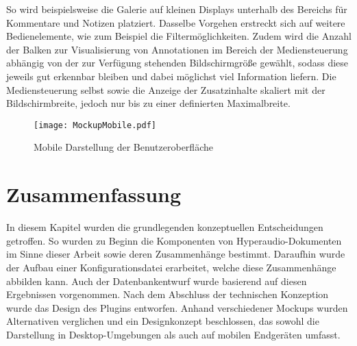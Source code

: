 So wird beispielsweise die Galerie auf kleinen Displays unterhalb des Bereichs für Kommentare und Notizen platziert. Dasselbe Vorgehen erstreckt sich auf weitere Bedienelemente, wie zum Beispiel die Filtermöglichkeiten. Zudem wird die Anzahl der Balken zur Visualisierung von Annotationen im Bereich der Mediensteuerung abhängig von der zur Verfügung stehenden Bildschirmgröße gewählt, sodass diese jeweils gut erkennbar bleiben und dabei möglichst viel Information liefern. Die Mediensteuerung selbst sowie die Anzeige der Zusatzinhalte skaliert mit der Bildschirmbreite, jedoch nur bis zu einer definierten Maximalbreite.

\begin{figure}[h!]
\texttt{[image: MockupMobile.pdf]}
\caption{\label{fig:MockupMobile} Mobile Darstellung der Benutzeroberfläche}
\end{figure}

\section{Zusammenfassung}
In diesem Kapitel wurden die grundlegenden konzeptuellen Entscheidungen getroffen. So wurden zu Beginn die Komponenten von Hyperaudio-Dokumenten im Sinne dieser Arbeit sowie deren Zusammenhänge bestimmt. Daraufhin wurde der Aufbau einer Konfigurationsdatei erarbeitet, welche diese Zusammenhänge abbilden kann. Auch der Datenbankentwurf wurde basierend auf diesen Ergebnissen vorgenommen. Nach dem Abschluss der technischen Konzeption wurde das Design des Plugins entworfen. Anhand verschiedener Mockups wurden Alternativen verglichen und ein Designkonzept beschlossen, das sowohl die Darstellung in Desktop-Umgebungen als auch auf mobilen Endgeräten umfasst.
